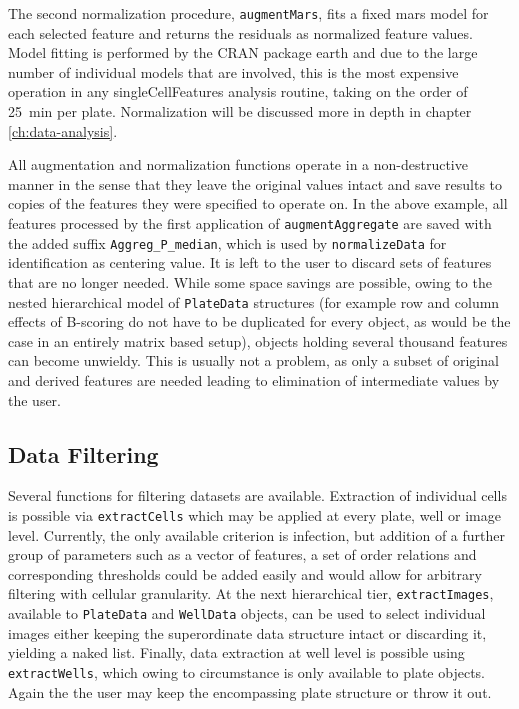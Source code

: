 The second normalization procedure, \texttt{augmentMars}, fits a fixed \gls{mars} model for each selected feature and returns the residuals as normalized feature values. Model fitting is performed by the CRAN package earth \citep{Hastie2015} and due to the large number of individual models that are involved, this is the most expensive operation in any singleCellFeatures analysis routine, taking on the order of \SI{25}{\minute} per plate. Normalization will be discussed more in depth in chapter \ref{ch:data-analysis}.

All augmentation and normalization functions operate in a non-destructive manner in the sense that they leave the original values intact and save results to copies of the features they were specified to operate on. In the above example, all features processed by the first application of \texttt{augmentAggregate} are saved with the added suffix \texttt{Aggreg_P_median}, which is used by \texttt{normalizeData} for identification as centering value. It is left to the user to discard sets of features that are no longer needed. While some space savings are possible, owing to the nested hierarchical model of \texttt{PlateData} structures (for example row and column effects of B-scoring do not have to be duplicated for every object, as would be the case in an entirely matrix based setup), objects holding several thousand features can become unwieldy. This is usually not a problem, as only a subset of original and derived features are needed leading to elimination of intermediate values by the user.

\subsection{Data Filtering}
Several functions for filtering datasets are available. Extraction of individual cells is possible via \texttt{extractCells} which may be applied at every plate, well or image level. Currently, the only available criterion is infection, but addition of a further group of parameters such as a vector of features, a set of order relations and corresponding thresholds could be added easily and would allow for arbitrary filtering with cellular granularity. At the next hierarchical tier, \texttt{extractImages}, available to \texttt{PlateData} and \texttt{WellData} objects, can be used to select individual images either keeping the superordinate data structure intact or discarding it, yielding a naked list. Finally, data extraction at well level is possible using \texttt{extractWells}, which owing to circumstance is only available to plate objects. Again the the user may keep the encompassing plate structure or throw it out.

